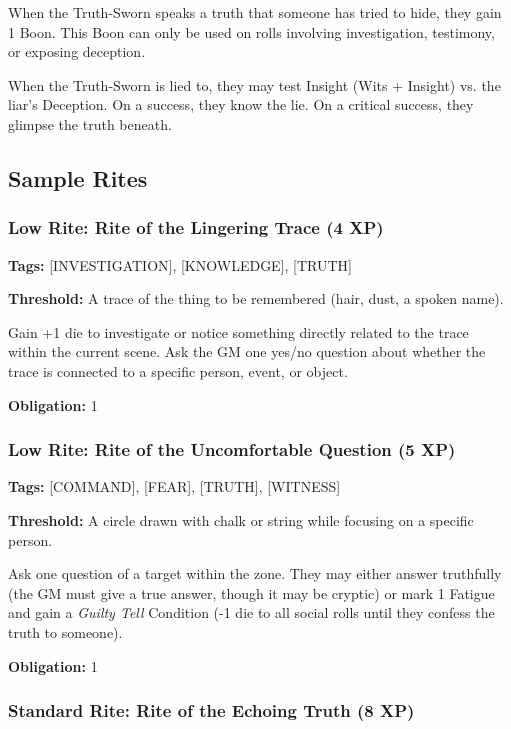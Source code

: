When the Truth-Sworn speaks a truth that someone has tried to hide, they gain 1 Boon. This Boon can only be used on rolls involving investigation, testimony, or exposing deception.

When the Truth-Sworn is lied to, they may test Insight (Wits + Insight) vs. the liar's Deception. On a success, they know the lie. On a critical success, they glimpse the truth beneath.

\subsection{Sample Rites}

\subsubsection{Low Rite: Rite of the Lingering Trace (4 XP)}

\textbf{Tags:} [INVESTIGATION], [KNOWLEDGE], [TRUTH]

\textbf{Threshold:} A trace of the thing to be remembered (hair, dust, a spoken name).

Gain +1 die to investigate or notice something directly related to the trace within the current scene. Ask the GM one yes/no question about whether the trace is connected to a specific person, event, or object.

\textbf{Obligation:} 1

\subsubsection{Low Rite: Rite of the Uncomfortable Question (5 XP)}

\textbf{Tags:} [COMMAND], [FEAR], [TRUTH], [WITNESS]

\textbf{Threshold:} A circle drawn with chalk or string while focusing on a specific person.

Ask one question of a target within the zone. They may either answer truthfully (the GM must give a true answer, though it may be cryptic) or mark 1 Fatigue and gain a \textit{Guilty Tell} Condition (-1 die to all social rolls until they confess the truth to someone).

\textbf{Obligation:} 1

\subsubsection{Standard Rite: Rite of the Echoing Truth (8 XP)}


